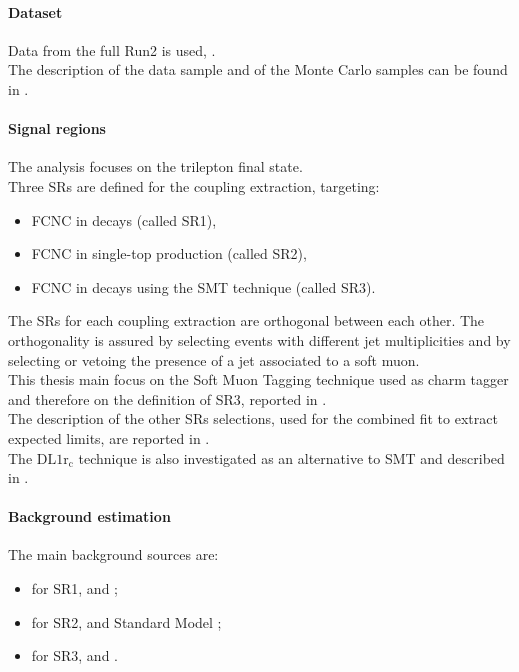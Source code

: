 \paragraph{Dataset}
Data from the full Run2 is used, \lumi. \\
The description of the data sample and of the Monte Carlo samples can
be found in .

\paragraph{Signal regions}
The analysis focuses on the trilepton final state. \\
Three SRs are defined for the \tZc coupling extraction, targeting:
\begin{itemize}
	\item FCNC \tZc in \ttbar decays (called SR1\tZc), 
	\item FCNC \tZc in single-top production (called SR2\tZc), 
	\item FCNC \tZc in \ttbar decays using the SMT technique (called SR3\tZc). 
\end{itemize}
The SRs for each coupling extraction are orthogonal between each other. 
The orthogonality is assured by selecting events with different jet multiplicities 
and by selecting or vetoing the presence of a jet associated to a soft muon.\\
This thesis main focus on the Soft Muon Tagging technique used as charm tagger and therefore on the definition of SR3\tZc, reported in .\\
The description of the other SRs selections, used for the combined fit to extract expected limits, are reported in .\\
The $\mathrm{DL1r_{c}}$ technique is also investigated as an alternative to SMT and described in .

\paragraph{Background estimation}
The main background sources are:
\begin{itemize}
	\item for SR1\tZc, \ttZ and \VVHF;
	\item for SR2\tZc, \VVHF and Standard Model \tZq ;
	\item for SR3\tZc, \ttZ and \VVHF.
\end{itemize}

